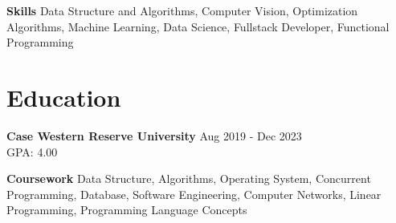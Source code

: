 \documentclass[11pt]{article}
\begin{document}
    \hspace{10pt}\textbf{Skills} {\small Data Structure and Algorithms, Computer Vision, Optimization Algorithms, Machine Learning, Data Science, Fullstack Developer, Functional Programming}
    \vspace{-10pt}
      
\section{Education}
    \hspace{10pt}\textbf{Case Western Reserve University} \hfill {\small Aug 2019 - Dec 2023}\\
    \hfill GPA: 4.00

    \hspace{10pt}\textbf{Coursework} {\small Data Structure, Algorithms, Operating System, Concurrent Programming, Database, Software Engineering, Computer Networks, Linear Programming, Programming Language Concepts}
\end{document}
